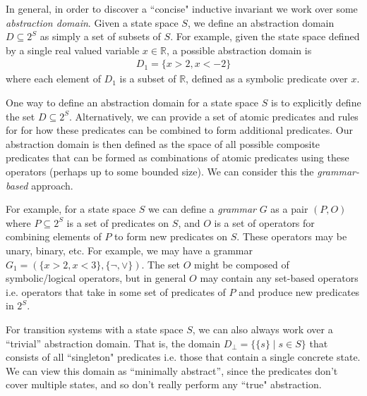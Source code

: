 \documentclass[10pt]{article}
\begin{document}

In general, in order to  discover a ``concise" inductive invariant we work over some \textit{abstraction domain}. Given a state space $S$, we define an abstraction domain $D \subseteq 2^S$ as simply a set of subsets of $S$. For example, given the state space defined by a single real valued variable $x \in \mathbb{R}$, a possible abstraction domain is
\begin{align*}
    D_1 = \{x > 2, x < - 2\}
\end{align*} 
where each element of $D_1$ is a subset of $\mathbb{R}$, defined as a symbolic predicate over $x$.

One way to define an abstraction domain for a state space $S$ is to explicitly define the set $D \subseteq 2^S$. Alternatively, we can provide a set of atomic predicates and rules for for how these predicates can be combined to form additional predicates. Our abstraction domain is then defined as the space of all possible composite predicates that can be formed as combinations of atomic predicates using these operators (perhaps up to some bounded size). We can consider this the \textit{grammar-based} approach.

For example, for a state space $S$ we can define a \textit{grammar} $G$ as a pair $(P,O)$ where $P \subseteq 2^S$ is a set of predicates on $S$, and $O$ is a set of operators for combining elements of $P$ to form new predicates on $S$. These operators may be unary, binary, etc. For example, we may have a grammar $G_1 = (\{x>2, x < 3\}, \{\neg, \vee\})$. The set $O$ might be composed of symbolic/logical operators, but in general $O$ may contain any set-based operators i.e. operators that take in some set of predicates of $P$ and produce new predicates in $2^S$.


For transition systems with a state space $S$, we can also always work over a ``trivial'' abstraction domain. That is, the domain $D_{\bot} = \{\{s\} \mid s \in S\}$ that consists of all ``singleton" predicates i.e. those that contain a single concrete state. We can view this domain as ``minimally abstract'', since the predicates don't cover multiple states, and so don't really perform any ``true" abstraction.
\end{document}
